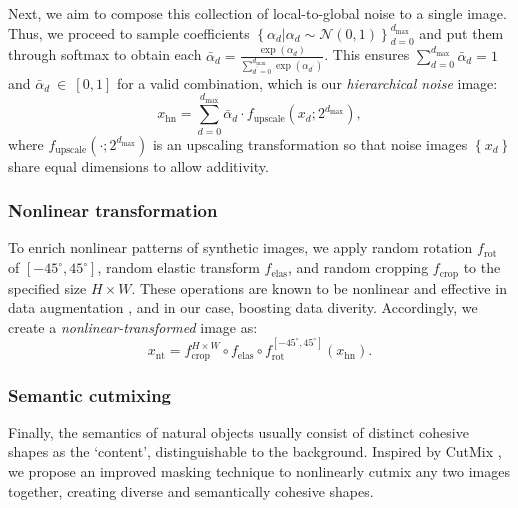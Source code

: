 \begin{foldable} %
    Next, we aim to compose this collection of local-to-global noise to a single image.
    Thus, we proceed to sample coefficients $\displaystyle \left\{ \alpha_{d}|\alpha_{d}\sim\mathcal{N}\left(0,1\right) \right\}_{d=0}^{d_{\text{max}}}$ and put them through softmax to obtain each $\displaystyle \bar{\alpha}_{d}=\frac{\exp\left(\alpha_{d}\right)}{\sum_{d^\prime=0}^{d_\text{max}}\exp\left(\alpha_{d^\prime}\right)}$.
    This ensures $\sum_{d=0}^{d_{\text{max}}}\bar{\alpha}_{d}=1$ and $\bar{\alpha}_{d}~\in~[0, 1]$ for a valid combination, which is our \textit{hierarchical noise} image:
    \begin{equation} \label{eq:synthesis-hiernoise-combine}
        x_{\text{hn}}=\sum_{d=0}^{d_{\text{max}}}\bar{\alpha}_{d}\cdot f_{\text{upscale}}\left(x_{d};2^{d_\text{max}}\right),
    \end{equation}
    where $f_{\text{upscale}}\left(\cdot;2^{d_{\text{max}}}\right)$ is an upscaling transformation so that noise images $\left\{ x_{d}\right\}$  share equal dimensions to allow additivity.
\end{foldable}


\subsubsection{Nonlinear transformation} \label{sssec:03-framework-synthesis-nonlintrans}
\begin{foldable} %
    To enrich nonlinear patterns of synthetic images, we apply random rotation $f_{\text{rot}}$ of $\left[-45^{\circ},45^{\circ}\right]$, random elastic transform $f_{\text{elas}}$, and random cropping $f_{\text{crop}}$ to the specified size $H\times W$.
    These operations are known to be nonlinear and effective in data augmentation \citep{simard2003best}, and in our case, boosting data diverity.
    Accordingly, we create a \textit{nonlinear-transformed} image as:
    \begin{equation} \label{eq:synthesis-nonlintrans}
        x_{\text{nt}}=f_{\text{crop}}^{H\times W} \circ f_{\text{elas}} \circ f_{\text{rot}}^{\left[-45^{\circ},45^{\circ}\right]}\left(x_{\text{hn}}\right).
    \end{equation}
\end{foldable}


\subsubsection{Semantic cutmixing} \label{sssec:03-framework-synthesis-semcutmix}
\begin{foldable} %
    Finally, the semantics of natural objects usually consist of distinct cohesive shapes as the `content', distinguishable to the background.
    Inspired by CutMix \citep{yun2019cutmix}, we propose an improved masking technique to nonlinearly cutmix any two images together, creating diverse and semantically cohesive shapes.
\end{foldable}

